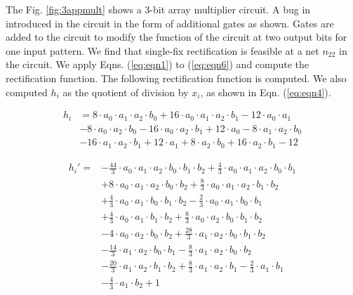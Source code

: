 \begin{Example}
The Fig. \ref{fig:3appmult} shows a 3-bit array multiplier circuit. A bug in introduced in the circuit in the form of additional gates as shown. Gates are added to the circuit to modify the function of the circuit at two output bits for one input pattern. We find that single-fix rectification is feasible at a net $n_{22}$ in the circuit. We apply Eqns. (\ref{eq:eqn1}) to (\ref{eq:eqn6}) and compute the rectification function. The following rectification function is computed. We also computed $h_i$ as the quotient of division by $x_i$, as shown in Eqn. (\ref{eq:eqn4}).

\begin{equation}
    \begin{split}
h_i & = 8\cdot a_0\cdot a_1\cdot a_2\cdot b_0
+16\cdot a_0\cdot a_1\cdot a_2\cdot b_1
-12\cdot a_0\cdot a_1 \\
& -8\cdot a_0\cdot a_2\cdot b_0 
 -16\cdot a_0\cdot a_2\cdot b_1 
 +12\cdot a_0-8\cdot a_1\cdot a_2\cdot b_0 \\
& -16\cdot a_1\cdot a_2\cdot b_1 
+12\cdot a_1+8\cdot a_2\cdot b_0
+16\cdot a_2\cdot b_1
-12        
    \end{split}
    \nonumber
\end{equation}

\begin{equation}
    \begin{split}
h_i' = & -\frac{44}{3}\cdot a_0\cdot a_1\cdot a_2\cdot b_0\cdot b_1\cdot b_2+
\frac{4}{3}\cdot a_0\cdot a_1\cdot a_2\cdot b_0\cdot b_1 \\
& +8\cdot a_0\cdot a_1\cdot a_2\cdot b_0\cdot b_2
+\frac{8}{3}\cdot a_0\cdot a_1\cdot a_2\cdot b_1\cdot b_2 \\
& +\frac{4}{3} \cdot a_0\cdot a_1\cdot b_0\cdot b_1\cdot b_2
-\frac{2}{3}\cdot a_0\cdot a_1\cdot b_0\cdot b_1 \\
&+\frac{4}{3}\cdot a_0\cdot a_1\cdot b_1\cdot b_2
+\frac{8}{3}\cdot a_0\cdot a_2\cdot b_0\cdot b_1\cdot b_2 \\
& -4\cdot a_0\cdot a_2\cdot b_0\cdot b_2 
+\frac{28}{3}\cdot a_1\cdot a_2\cdot b_0\cdot b_1\cdot b_2 \\
& -\frac{14}{3}\cdot a_1\cdot a_2\cdot b_0\cdot b_1
-\frac{8}{3}\cdot a_1\cdot a_2\cdot b_0\cdot b_2 \\
&-\frac{20}{3}\cdot a_1\cdot a_2\cdot b_1\cdot b_2
+\frac{8}{3}\cdot a_1\cdot a_2\cdot b_1
-\frac{2}{3}\cdot a_1\cdot b_1 \\
&-\frac{4}{3}\cdot a_1\cdot b_2
+1        
\end{split}
\nonumber
\end{equation}


\end{Example}
